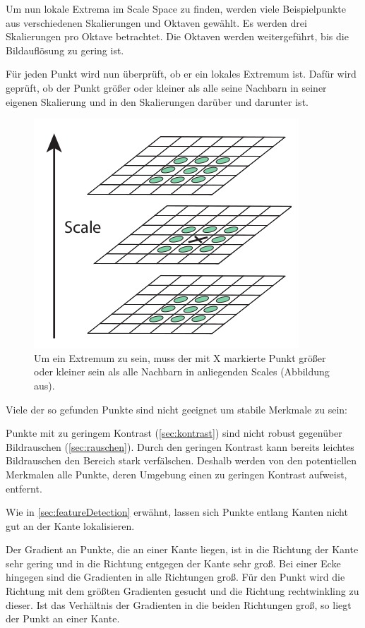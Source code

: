 Um nun lokale Extrema im Scale Space zu finden, werden viele Beispielpunkte aus verschiedenen Skalierungen und Oktaven gewählt. Es werden drei Skalierungen pro Oktave betrachtet. Die Oktaven werden weitergeführt, bis die Bildauflösung zu gering ist.

Für jeden Punkt wird nun überprüft, ob er ein lokales Extremum ist. Dafür wird geprüft, ob der Punkt größer oder kleiner als alle seine Nachbarn in seiner eigenen Skalierung und in den Skalierungen darüber und darunter ist.

\begin{figure}[h]
    \centering
		\includegraphics[scale=0.4]{bilder/sift_extrema.png}
    	\caption{Um ein Extremum zu sein, muss der mit X markierte Punkt größer oder kleiner sein als alle Nachbarn in anliegenden Scales (Abbildung aus\cite[S. 7]{Lowe2004}).}
\end{figure}

Viele der so gefunden Punkte sind nicht geeignet um stabile Merkmale zu sein:

Punkte mit zu geringem Kontrast (\ref{sec:kontrast}) sind nicht robust gegenüber Bildrauschen (\ref{sec:rauschen}). Durch den geringen Kontrast kann bereits leichtes Bildrauschen den Bereich stark verfälschen.
Deshalb werden von den potentiellen Merkmalen alle Punkte, deren Umgebung einen zu geringen Kontrast aufweist, entfernt.

Wie in \ref{sec:featureDetection} erwähnt, lassen sich Punkte entlang Kanten nicht gut an der Kante lokalisieren.

Der Gradient an Punkte, die an einer Kante liegen, ist in die Richtung der Kante sehr gering und in die Richtung entgegen der Kante sehr groß. Bei einer Ecke hingegen sind die Gradienten in alle Richtungen groß.
Für den Punkt wird die Richtung mit dem größten Gradienten gesucht und die Richtung rechtwinkling zu dieser. Ist das Verhältnis der Gradienten in die beiden Richtungen groß, so liegt der Punkt an einer Kante.

